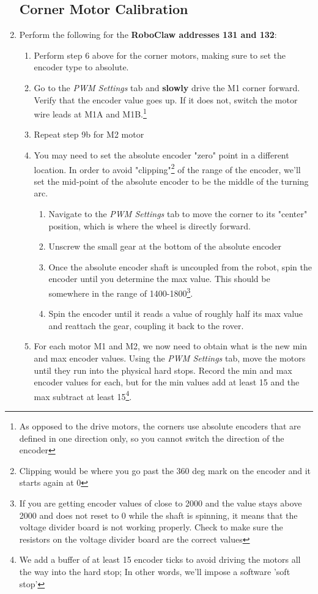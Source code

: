 \documentclass[12pt]{article}
\begin{document}
\begin{enumerate}
\subsection{Corner Motor Calibration}
\label{corner_cal}
	\item Perform the following for the \textbf{RoboClaw addresses 131 and 132}:
	\begin{enumerate}
		\item Perform step 6 above for the corner motors, making sure to set the encoder type to absolute. 
		\item Go to the \textit{PWM Settings} tab and \textbf{slowly} drive the M1 corner forward. Verify that the encoder value goes up. If it does not, switch the motor wire leads at M1A and M1B.\footnote{As opposed to the drive motors, the corners use absolute encoders that are defined in one direction only, so you cannot switch the direction of the encoder}
		\item Repeat step 9b for M2 motor
		\item You may need to set the absolute encoder "zero" point in a different location. In order to avoid "clipping"\footnote{Clipping would be where you go past the 360 deg mark on the encoder and it starts again at 0} of the range of the encoder, we'll set the mid-point of the absolute encoder to be the middle of the turning arc. 
		\begin{enumerate} 
			\item Navigate to the \textit{PWM Settings} tab to move the corner to its "center" position, which is where the wheel is directly forward. 
			\item Unscrew the small gear at the bottom of the absolute encoder
			\item Once the absolute encoder shaft is uncoupled from the robot, spin the encoder until you determine the max value. This should be somewhere in the range of 1400-1800\footnote{If you are getting encoder values of close to 2000 and the value stays above 2000 and does not reset to 0 while the shaft is spinning, it means that the voltage divider board is not working properly. Check to make sure the resistors on the voltage divider board are the correct values}.
			\item Spin the encoder until it reads a value of roughly half its max value and reattach the gear, coupling it back to the rover. 
		\end{enumerate}
		
		\item For each motor M1 and M2, we now need to obtain what is the new min and max encoder values. Using the \textit{PWM Settings} tab, move the motors until they run into the physical hard stops. Record the min and max encoder values for each, but for the min values add at least 15 and the max subtract at least 15\footnote{We add a buffer of at least 15 encoder ticks to avoid driving the motors all the way into the hard stop; In other words, we'll impose a software 'soft stop'}.
		

\end{enumerate}
\end{enumerate}
\end{document}
